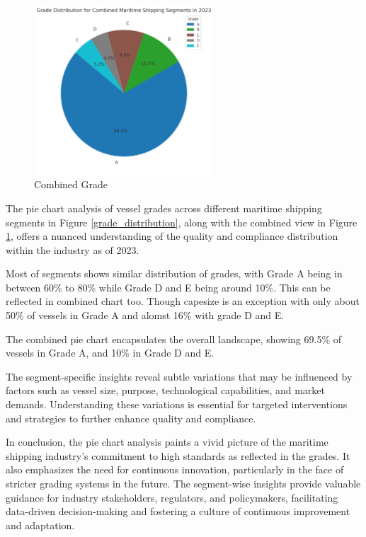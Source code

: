 \begin{figure}[h]
    \centering
    \includegraphics[width=0.6\textwidth]{images/combined_grade.png}
    \caption{Combined Grade}
    \label{combined_grade}
\end{figure}

The pie chart analysis of vessel grades across different maritime shipping segments in Figure \ref{grade_distribution}, 
along with the combined view in Figure \ref{combined_grade}, offers a nuanced understanding of the quality and compliance distribution within the industry as of 2023.


Most of segments shows similar distribution of grades, with Grade A being in between 60\% to 80\% while Grade D and E being around 10\%.
This can be reflected in combined chart too. Though capesize is an exception with only about 50\% of vessels in Grade A and alomst 16\% with grade D and E.

The combined pie chart encapsulates the overall landscape, showing 69.5\% of vessels in Grade A, and 10\% in Grade D and E.

The segment-specific insights reveal subtle variations that may be influenced by factors such as vessel size, purpose, technological capabilities, and market demands. 
Understanding these variations is essential for targeted interventions and strategies to further enhance quality and compliance.

In conclusion, the pie chart analysis paints a vivid picture of the maritime shipping industry's commitment to high standards as reflected in the grades. 
It also emphasizes the need for continuous innovation, particularly in the face of stricter grading systems in the future. 
The segment-wise insights provide valuable guidance for industry stakeholders, regulators, and policymakers, facilitating data-driven decision-making and fostering a culture of continuous improvement and adaptation.


